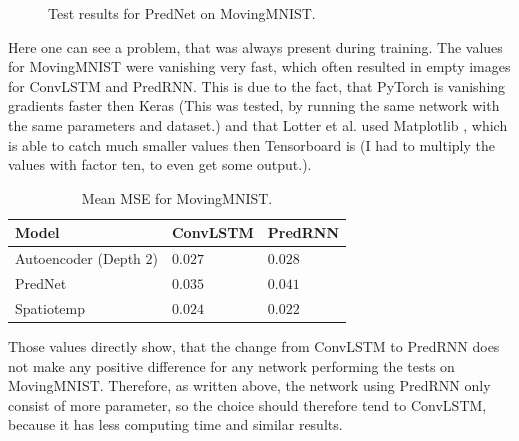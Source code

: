    \begin{figure}[H]
   \centering
   \qquad
   \qquad
   \caption{Test results for PredNet on MovingMNIST.}
   \label{figure::prednet_mnist_results}
  \end{figure}\noindent
  Here one can see a problem, that was always present during training. The values for MovingMNIST were vanishing very fast, which often resulted in empty images
  for ConvLSTM and PredRNN. This is due to the fact, that PyTorch is vanishing gradients faster then Keras \cite{chollet2015} (This was tested, by running the 
  same network with the same parameters and dataset.) and that Lotter et al. used 
  Matplotlib \cite{Hunter2007}, which is able to catch much smaller values then Tensorboard is (I had to multiply the values with factor ten, to even get some
  output.).
   \begin{table}[H]
    \begin{center}
     \begin{tabular}{| l | l | l |}\hline
      \textbf{Model} & \textbf{ConvLSTM} & \textbf{PredRNN} \\\hline
      Autoencoder (Depth $2$) & $0.027$ & $0.028$ \\\hline
      PredNet & $0.035$ & $0.041$ \\\hline
      Spatiotemp & $0.024$ & $0.022$ \\\hline
     \end{tabular}
    \end{center}
    \caption{Mean MSE for MovingMNIST.}
   \end{table}\noindent
   Those values directly show, that the change from ConvLSTM to PredRNN does not make any positive difference for any network performing the tests on MovingMNIST.
   Therefore, as written above, the network using PredRNN only consist of more parameter, so the choice should therefore tend to ConvLSTM, because it has less
   computing time and similar results.
   
